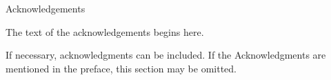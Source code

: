 \documentclass[11pt]{report}
\theoremstyle{plain}
\theoremstyle{definition}
\theoremstyle{corollary}
\theoremstyle{definition}
\theoremstyle{plain}
\theoremstyle{definition}
\theoremstyle{plain}
\begin{document}
%

\newpage
\begin{center}
\large
Acknowledgements
\end{center}
\normalsize
The text of the acknowledgements begins here.

If necessary, acknowledgments can be included.
If the Acknowledgments are mentioned in the preface, this section may be omitted. 

\tableofcontents

\listoftables
\end{document}
